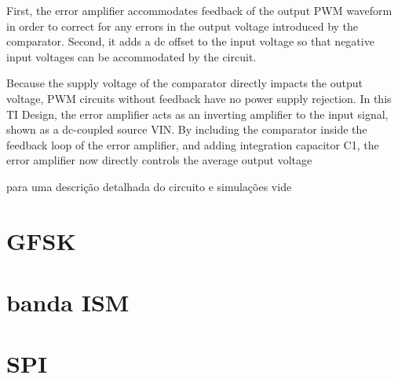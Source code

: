   First, the error amplifier accommodates feedback of the output PWM waveform in order to correct for any errors in the
output voltage introduced by the comparator. Second, it adds a dc offset to the input voltage so that negative input voltages can be accommodated by 
the circuit.
 
 Because the supply voltage of the comparator directly impacts the output voltage, PWM circuits without feedback have no power supply rejection. In 
this TI Design, the error amplifier acts as an inverting amplifier to the input signal, shown as a dc-coupled source VIN. By including the comparator 
inside the feedback loop of the error amplifier, and adding integration capacitor C1, the error amplifier now directly controls the average output 
voltage



para uma descrição detalhada do circuito e simulações vide \cite{pwm_modulator}

\section{GFSK}

\section{banda ISM}

\section{SPI}